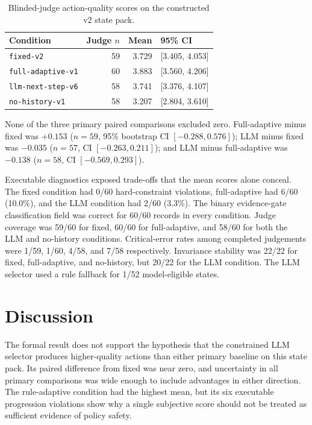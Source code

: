 \documentclass[final-report]{../project-plan/report-template}
\begin{document}
\begin{table}[ht]
  \centering
  \caption{Blinded-judge action-quality scores on the constructed v2 state pack.}
  \label{tab:formal-scores}
  \begin{tabular}{lrrl}
    \toprule
    Condition & Judge $n$ & Mean & 95\% CI \\
    \midrule
    \texttt{fixed-v2} & 59 & 3.729 & [3.405, 4.053] \\
    \texttt{full-adaptive-v1} & 60 & 3.883 & [3.560, 4.206] \\
    \texttt{llm-next-step-v6} & 58 & 3.741 & [3.376, 4.107] \\
    \texttt{no-history-v1} & 58 & 3.207 & [2.804, 3.610] \\
    \bottomrule
  \end{tabular}
\end{table}

None of the three primary paired comparisons excluded zero. Full-adaptive minus
fixed was $+0.153$ ($n=59$, 95\% bootstrap CI $[-0.288, 0.576]$); LLM minus
fixed was $-0.035$ ($n=57$, CI $[-0.263, 0.211]$); and LLM minus full-adaptive
was $-0.138$ ($n=58$, CI $[-0.569, 0.293]$).

Executable diagnostics exposed trade-offs that the mean scores alone conceal.
The fixed condition had 0/60 hard-constraint violations, full-adaptive had 6/60
(10.0\%), and the LLM condition had 2/60 (3.3\%). The binary evidence-gate
classification field was correct for 60/60 records in every condition. Judge
coverage was 59/60 for fixed, 60/60 for full-adaptive, and 58/60 for both the LLM
and no-history conditions. Critical-error rates among completed judgements were
1/59, 1/60, 4/58, and 7/58 respectively. Invariance stability was 22/22 for
fixed, full-adaptive, and no-history, but 20/22 for the LLM condition. The LLM
selector used a rule fallback for 1/52 model-eligible states.

\section{Discussion}

The formal result does not support the hypothesis that the constrained LLM
selector produces higher-quality actions than either primary baseline on this
state pack. Its paired difference from fixed was near zero, and uncertainty in
all primary comparisons was wide enough to include advantages in either
direction. The rule-adaptive condition had the highest mean, but its six
executable progression violations show why a single subjective score should not
be treated as sufficient evidence of policy safety.
\end{document}

